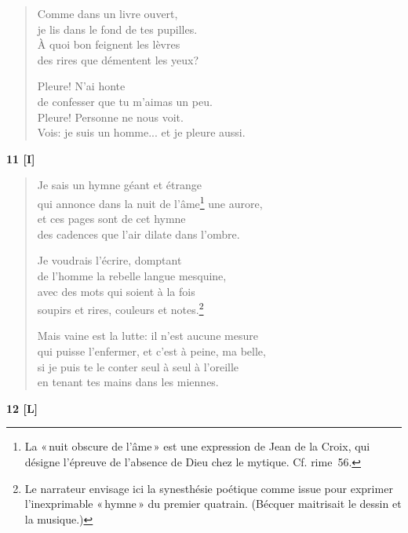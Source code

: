 \begin{verse}
  Comme dans un livre ouvert, \\
  je lis dans le fond de tes pupilles. \\
  À quoi bon feignent les lèvres \\
  des rires que démentent les yeux?

  Pleure! N'ai honte \\
  de confesser que tu m'aimas un peu. \\
  Pleure! Personne ne nous voit. \\
  Vois: je suis un homme... et je pleure aussi.
\end{verse}

\bigskip

\begin{center}
  \textbf{11 [I]}
\end{center}

\begin{verse}
  Je sais un hymne géant et étrange \\
  qui annonce dans la nuit de l'âme\footnote{La «\,nuit obscure de
  l'âme\,» est une expression de Jean de la Croix, qui
  désigne l'épreuve de l'absence de Dieu chez le
  mytique. Cf. rime~56.} une aurore, \\
  et ces pages sont de cet hymne \\
  des cadences que l'air dilate dans l'ombre.

  Je voudrais l'écrire, domptant \\
  de l'homme la rebelle langue mesquine, \\
  avec des mots qui soient à la fois \\
  soupirs et rires, couleurs et notes.\footnote{Le narrateur envisage
  ici la synesthésie poétique comme issue pour exprimer
  l'inexprimable «\,hymne\,» du premier quatrain. (Bécquer maitrisait le
  dessin et la musique.)}

  Mais vaine est la lutte: il n'est aucune mesure \\
  qui puisse l'enfermer, et c'est à peine, ma belle, \\
  si je puis te le conter seul à seul à l'oreille \\
  en tenant tes mains dans les miennes.
\end{verse}

\bigskip

\begin{center}
  \textbf{12 [L]}
\end{center}


